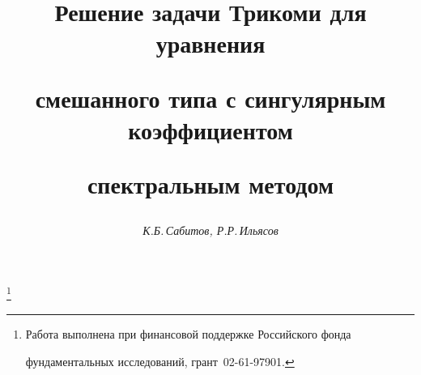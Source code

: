 







\newcommand{\sgn}{\operatorname{sgn}}


\newcommand{\tg}{\operatorname{tg}}


\newcommand{\tts}[1]{}







\setcounter{page}{64}















\author{\it К.Б.\,Сабитов, Р.Р.\,Ильясов}




\title{Решение задачи Трикоми для уравнения


смешанного типа с сингулярным коэффициентом


спектральным методом}


\thanks{Работа выполнена при финансовой поддержке Российского фонда


фундаментальных исследований, грант \No\,02-61-97901.}





\date{}




\pagestyle{plain} %







\maketitle


